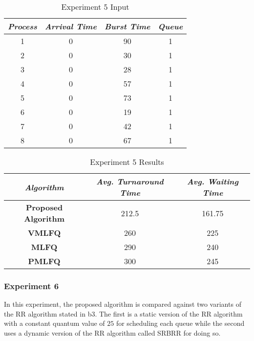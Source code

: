 \documentclass[conference]{IEEEtran}
\newcommand\T{\rule{0pt}{2.6ex}}       %
\newcommand\B{\rule[-1.2ex]{0pt}{0pt}} %
\begin{document}
\begin{table}[H]
    \caption{Experiment 5 Input}
    \centering
     \begin{tabular}{||c c c c||} 
     \hline
     \textit{\textbf{Process}} & \textit{\textbf{Arrival Time}} & \textit{\textbf{Burst Time}} & \textit{\textbf{Queue}} \T \B \\ 
     \hline
     \hline
     1 & 0 & 90 & 1 \T \B \\ 
     \hline
     2 & 0 & 30 & 1 \T \B \\
     \hline
     3 & 0 & 28 & 1 \T \B \\
     \hline
     4 & 0 & 57 & 1 \T \B \\
     \hline
     5 & 0 & 73 & 1 \T \B \\ 
     \hline
     6 & 0 & 19 & 1 \T \B \\ 
     \hline
     7 & 0 & 42 & 1 \T \B \\ 
     \hline
     8 & 0 & 67 & 1 \T \B \\ 
     \hline
     \end{tabular}
\end{table}

\begin{table}[H]
    \caption{Experiment 5 Results}
    \centering
    \begin{tabular}{||c c c||}
        \hline
        \textit{\textbf{Algorithm}} & \textit{\textbf{Avg. Turnaround Time}} & \textit{\textbf{Avg. Waiting Time}}\T \B \\
    \hline
    \hline
    \textbf{Proposed Algorithm} & 212.5 & 161.75 \T \B\\ \hline
    \textbf{VMLFQ} & 260 & 225 \T \B\\ \hline
    \textbf{MLFQ} & 290 & 240 \T \B\\ \hline
    \textbf{PMLFQ} & 300 & 245 \T \B\\ \hline
     \end{tabular}
\end{table}

\subsubsection{Experiment 6}

In this experiment, the proposed algorithm is compared against two variants of the RR algorithm stated in {b3}. The first is a static version of the RR algorithm with a constant quantum value of $25$ for scheduling each queue while the second uses a dynamic version of the RR algorithm called SRBRR for doing so. 
\end{document}
